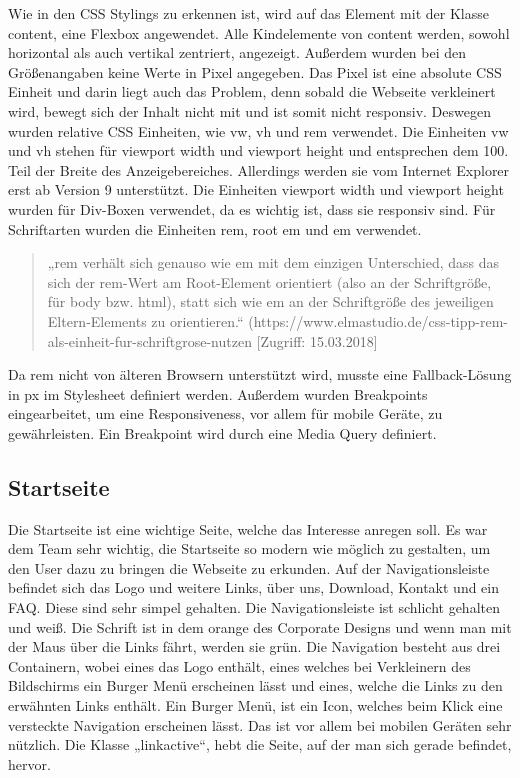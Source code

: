 Wie in den CSS Stylings zu erkennen ist, wird auf das Element mit der Klasse content, eine Flexbox angewendet. Alle Kindelemente von content werden, sowohl horizontal als auch vertikal zentriert, angezeigt. Außerdem wurden bei den Größenangaben keine Werte in Pixel angegeben. Das Pixel ist eine absolute CSS Einheit und darin liegt auch das Problem, denn sobald die Webseite verkleinert wird, bewegt sich der Inhalt nicht mit und ist somit nicht responsiv. Deswegen wurden relative CSS Einheiten, wie vw, vh und rem verwendet. Die Einheiten vw und vh stehen für viewport width und viewport height und entsprechen dem 100. Teil der Breite des Anzeigebereiches. Allerdings werden sie vom Internet Explorer erst ab Version 9 unterstützt. Die Einheiten viewport width und viewport height wurden für Div-Boxen verwendet, da es wichtig ist, dass sie responsiv sind.\cite{wiki}  Für Schriftarten wurden die Einheiten rem, root em und em verwendet. 
\begin{quote}
„rem verhält sich genauso wie em mit dem einzigen Unterschied, dass das sich der rem-Wert am Root-Element orientiert (also an der Schriftgröße, für body bzw. html), statt sich wie em an der Schriftgröße des jeweiligen Eltern-Elements zu orientieren.“ (https://www.elmastudio.de/css-tipp-rem-als-einheit-fur-schriftgrose-nutzen [Zugriff: 15.03.2018]
\end{quote}
Da rem nicht von älteren Browsern unterstützt wird, musste eine Fallback-Lösung in px im Stylesheet definiert werden. \cite{remzitat}  Außerdem wurden Breakpoints eingearbeitet, um eine Responsiveness, vor allem für mobile Geräte, zu gewährleisten. Ein Breakpoint wird durch eine Media Query definiert.
\subsection{Startseite}
Die Startseite ist eine wichtige Seite, welche das Interesse anregen soll. Es war dem Team sehr wichtig, die Startseite so modern wie möglich zu gestalten, um den User dazu zu bringen die Webseite zu erkunden. Auf der Navigationsleiste befindet sich das Logo und weitere Links, über uns, Download, Kontakt und ein FAQ. Diese sind sehr simpel gehalten. Die Navigationsleiste ist schlicht gehalten und weiß. Die Schrift ist in dem orange des Corporate Designs und wenn man mit der Maus über die Links fährt, werden sie grün. Die Navigation besteht aus drei Containern, wobei eines das Logo enthält, eines welches bei Verkleinern des Bildschirms ein Burger Menü erscheinen lässt und eines, welche die Links zu den erwähnten Links enthält. Ein Burger Menü, ist ein Icon, welches beim Klick eine versteckte Navigation erscheinen lässt. Das ist vor allem bei mobilen Geräten sehr nützlich.\cite{burgermenu} Die Klasse „linkactive“, hebt die Seite, auf der man sich gerade befindet, hervor.  \newpage

